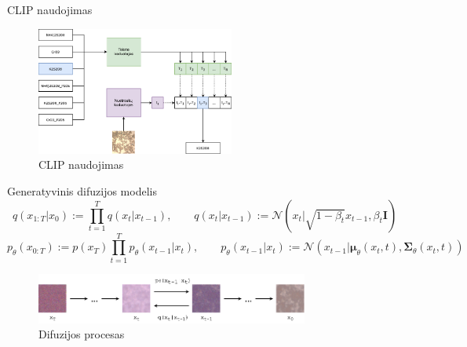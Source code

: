 \begin{frame}[c]{CLIP naudojimas}
    \begin{figure}
        \centering
        \includegraphics[width=0.58\textwidth]{img/CLIP_inference_lt.png}
        \caption{CLIP naudojimas}
        \label{fig:clip_inference}
    \end{figure}
    \begin{center}
        {\tiny \cite{CLIP}}
    \end{center}
\end{frame}



\begin{frame}[c]{Generatyvinis difuzijos modelis}
    \begin{equation}
        q(x_{1:T}|x_0) := \prod_{t=1}^{T}q(x_t|x_{t-1}), \quad\quad q(x_t|x_{t-1}) := \mathcal{N}(x_t| \sqrt{1 - \beta_t}x_{t-1}, \beta_t\textbf{I}) \label{eq:diffusion_process}
    \end{equation}
    \begin{equation}
        p_\theta(x_{0:T}) := p(x_T)\prod_{t=1}^{T}p_\theta(x_{t-1}|x_t), \quad\quad p_\theta(x_{t-1}|x_t) := \mathcal{N}(x_{t-1}| \boldsymbol{\mu}_\theta(x_t, t), \boldsymbol{\Sigma}_\theta(x_t, t))
        \label{eq:reverse_process}
    \end{equation}
    \begin{center}
        {\tiny \cite{Diffusion_Ho}}
    \end{center}
    \begin{figure}
        \centering
        \includegraphics[width=0.8\textwidth]{img/Markov_Chain.png}
        \caption{Difuzijos procesas}
        \label{fig:diffusion}
    \end{figure}
\end{frame}
